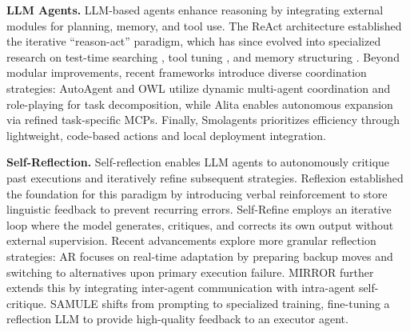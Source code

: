 

\noindent\textbf{LLM Agents.} LLM-based agents enhance reasoning by integrating external modules for planning, memory, and tool use. The ReAct \citep{yao2022react} architecture established the iterative ``reason-act'' paradigm, which has since evolved into specialized research on test-time searching \citep{yao2023tree, besta2024graph}, tool tuning \citep{zeng2025tool, qian2025toolrl, jiang2025verltool}, and memory structuring \citep{xu2025mem, chhikara2025mem0}. Beyond modular improvements, recent frameworks introduce diverse coordination strategies: AutoAgent \citep{chen2023autoagents} and OWL \citep{hu2025owl} utilize dynamic multi-agent coordination and role-playing for task decomposition, while Alita \citep{qiu2025alita} enables autonomous expansion via refined task-specific MCPs. Finally, Smolagents \citep{smolagents} prioritizes efficiency through lightweight, code-based actions and local deployment integration.


\noindent\textbf{Self-Reflection.} Self-reflection enables LLM agents to autonomously critique past executions and iteratively refine subsequent strategies. Reflexion \citep{shinn2023reflexion} established the foundation for this paradigm by introducing verbal reinforcement to store linguistic feedback to prevent recurring errors. Self-Refine \citep{madaan2023self} employs an iterative loop where the model generates, critiques, and corrects its own output without external supervision. Recent advancements explore more granular reflection strategies: AR \citep{wang2024devil} focuses on real-time adaptation by preparing backup moves and switching to alternatives upon primary execution failure. MIRROR \citep{guo2025mirror} further extends this by integrating inter-agent communication with intra-agent self-critique. SAMULE \citep{ge2025samule} shifts from prompting to specialized training, fine-tuning a reflection LLM to provide high-quality feedback to an executor agent. 
